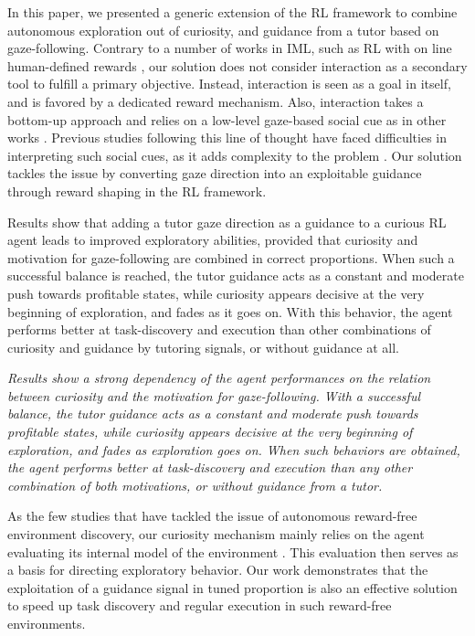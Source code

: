 \documentclass[letterpaper, 10 pt, conference]{ieeeconf}  %
\begin{document}
In this paper, we presented a generic extension of the RL framework to combine autonomous exploration out of curiosity, and guidance from a tutor based on gaze-following. Contrary to a number of works in IML, such as RL with on line human-defined rewards \cite{knox_interactively_2009}, our solution does not consider interaction as a secondary tool to fulfill a primary objective. Instead, interaction is seen as a goal in itself, and is favored by a dedicated reward mechanism. Also, interaction takes a bottom-up approach and relies on a low-level gaze-based social cue as in other works \cite{broz_learning_2009}. Previous studies following this line of thought have faced difficulties in interpreting such social cues, as it adds complexity to the problem \cite{najar_social-task_2015,lopes_simultaneous_2011,grizou_robot_2013}. Our solution tackles the issue by converting gaze direction into an exploitable guidance through reward shaping in the RL framework. 

Results show that adding a tutor gaze direction as a guidance to a curious RL agent leads to improved exploratory abilities, provided that curiosity and motivation for gaze-following are combined in correct proportions. When such a successful balance is reached, the tutor guidance acts as a constant and moderate push towards profitable states, while curiosity appears decisive at the very beginning of exploration, and fades as it goes on. With this behavior, the agent performs better at task-discovery and execution than other combinations of curiosity and guidance by tutoring signals, or without guidance at all.  

\emph{Results show a strong dependency of the agent performances on the relation between curiosity and the motivation for gaze-following. With a successful balance, the tutor guidance acts as a constant and moderate push towards profitable states, while curiosity appears decisive at the very beginning of exploration, and fades as exploration goes on. When such behaviors are obtained, the agent performs better at task-discovery and execution than any other combination of both motivations, or without guidance from a tutor.} 

As the few studies that have tackled the issue of autonomous reward-free environment discovery, our curiosity mechanism mainly relies on the agent evaluating its internal model of the environment \cite{oudeyer_playground_2005,little_learning_2013}. This evaluation then serves as a basis for directing exploratory behavior. Our work demonstrates that the exploitation of a guidance signal in tuned proportion is also an effective solution to speed up task discovery and regular execution in such reward-free environments.
\end{document}
